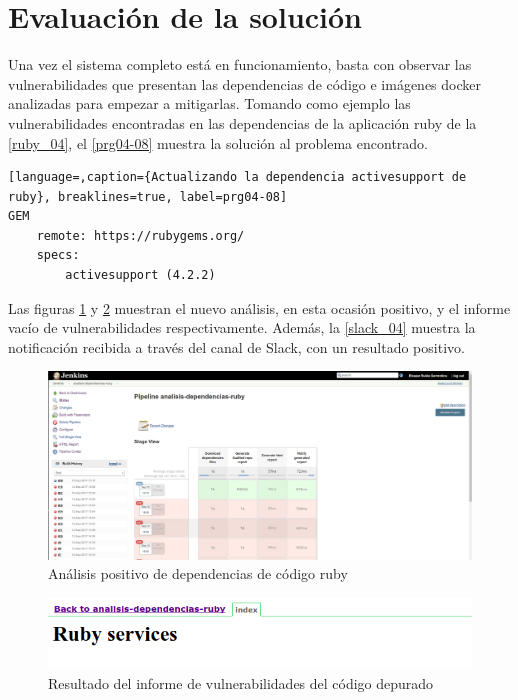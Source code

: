 \section{Evaluación de la solución}

Una vez el sistema completo está en funcionamiento, basta con observar las vulnerabilidades que presentan las dependencias de código e imágenes docker analizadas para empezar a mitigarlas. Tomando como ejemplo las vulnerabilidades encontradas en las dependencias de la aplicación ruby de la \autoref{ruby_04}, el \autoref{prg04-08} muestra la solución al problema encontrado.

\begin{lstlisting}[language=,caption={Actualizando la dependencia activesupport de ruby}, breaklines=true, label=prg04-08]
GEM
	remote: https://rubygems.org/
	specs:
		activesupport (4.2.2)
\end{lstlisting}

Las figuras \ref{ruby_05} y \ref{ruby_06} muestran el nuevo análisis, en esta ocasión positivo, y el informe vacío de vulnerabilidades respectivamente. Además, la \autoref{slack_04} muestra la notificación recibida a través del canal de Slack, con un resultado positivo.

\begin{figure}[H]
	\centering
	\includegraphics[width=1.00\linewidth]
	{desarrollo/figuras/ruby_05.png}
	\caption{Análisis positivo de dependencias de código ruby}
	\label{ruby_05}
\end{figure}

\begin{figure}[H]
	\centering
	\includegraphics[width=1.00\linewidth]
	{desarrollo/figuras/ruby_06.png}
	\caption{Resultado del informe de vulnerabilidades del código depurado}
	\label{ruby_06}
\end{figure}

